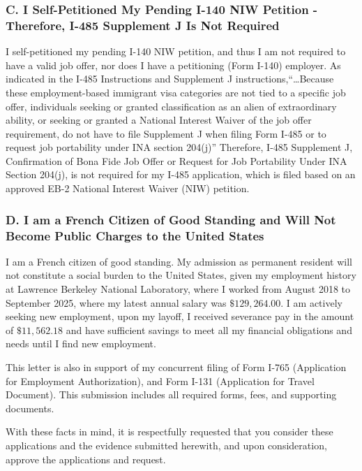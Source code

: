 \subsubsection*{C. I Self-Petitioned My Pending I-140 NIW Petition - Therefore, I-485 Supplement J Is Not Required}

I self-petitioned my pending I-140 NIW petition, and thus I am not required to have a valid job offer, nor does I have a petitioning (Form I-140) employer. As indicated in the I-485 Instructions and Supplement J instructions,``…Because these employment-based immigrant visa categories are not tied to a specific job offer, individuals seeking or granted classification as an alien of extraordinary ability, or seeking or granted a National Interest Waiver of the job offer requirement, do not have to file Supplement J when filing Form I-485 or to request job portability under INA section 204(j)'' Therefore, I-485 Supplement J, Confirmation of Bona Fide Job Offer or Request for Job Portability Under INA Section 204(j), is not required for my I-485 application, which is filed based on an approved  EB-2 National Interest Waiver (NIW) petition.

\subsubsection*{D. I am a French Citizen of Good Standing and Will Not Become Public Charges to the United States}

I am a French citizen of good standing. 
My admission as permanent resident will not constitute a social burden to the United States, given my employment history at Lawrence Berkeley National Laboratory, where I worked from August 2018 to September 2025, where my latest annual salary was $\$129,264.00$. I am actively seeking new employment, upon my layoff, I received severance pay in the amount of $\$11,562.18$ and have sufficient savings to meet all my financial obligations and needs until I find new employment.

This letter is also in support of my concurrent filing of Form I-765 (Application for Employment Authorization), and Form I-131 (Application for Travel Document). This submission includes all required forms, fees, and supporting documents.

With these facts in mind, it is respectfully requested that you consider these applications and the evidence submitted herewith, and upon consideration, approve the applications and request.


\label{endOfCoverLetter}
\clearpage
\pagestyle{empty}
